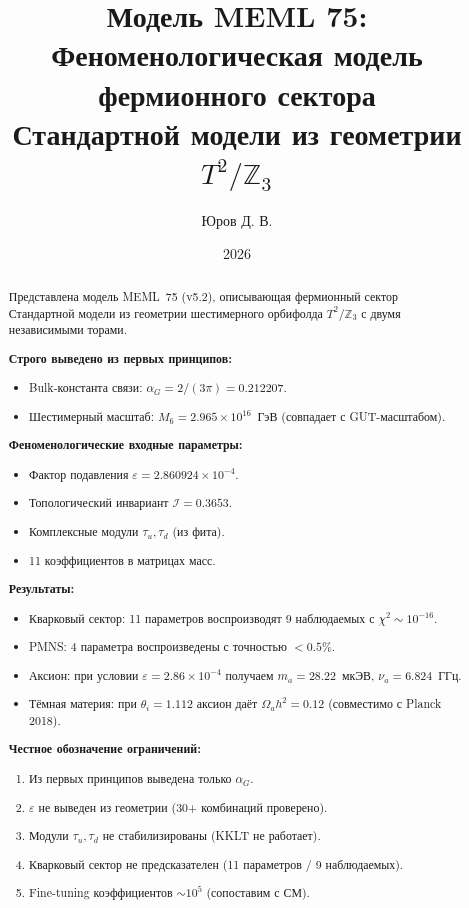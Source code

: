 \documentclass[12pt,a4paper]{article}
\title{%
    \textbf{Модель MEML 75:} \\[0.3cm]
    \large Феноменологическая модель фермионного сектора \\
    Стандартной модели из геометрии $T^2/\mathbb{Z}_3$%
}
\author{Юров Д. В.}
\date{2026}
\numberwithin{equation}{section}
\begin{document}
\maketitle

\begin{abstract}
Представлена модель MEML~75 (v5.2), описывающая фермионный сектор 
Стандартной модели из геометрии шестимерного орбифолда 
$T^2/\mathbb{Z}_3$ с двумя независимыми торами.

\textbf{Строго выведено из первых принципов:}
\begin{itemize}[leftmargin=1.5em,itemsep=0.05em]
\item Bulk-константа связи: $\alpha_G = 2/(3\pi) = 0.212207$.
\item Шестимерный масштаб: $M_6 = 2.965\times 10^{16}$~ГэВ 
(совпадает с GUT-масштабом).
\end{itemize}

\textbf{Феноменологические входные параметры:}
\begin{itemize}[leftmargin=1.5em,itemsep=0.05em]
\item Фактор подавления $\varepsilon = 2.860924\times 10^{-4}$.
\item Топологический инвариант $\mathcal{I} = 0.3653$.
\item Комплексные модули $\tau_u, \tau_d$ (из фита).
\item 11 коэффициентов в матрицах масс.
\end{itemize}

\textbf{Результаты:}
\begin{itemize}[leftmargin=1.5em,itemsep=0.05em]
\item Кварковый сектор: 11 параметров воспроизводят 9 наблюдаемых 
с $\chi^2 \sim 10^{-16}$.
\item PMNS: 4 параметра воспроизведены с точностью $<0.5\%$.
\item Аксион: при условии $\varepsilon = 2.86\times 10^{-4}$ 
получаем $m_a = 28.22$~мкЭВ, $\nu_a = 6.824$~ГГц.
\item Тёмная материя: при $\theta_i = 1.112$ аксион даёт 
$\Omega_a h^2 = 0.12$ (совместимо с Planck 2018).
\end{itemize}

\textbf{Честное обозначение ограничений:}
\begin{enumerate}[leftmargin=1.5em,itemsep=0.05em]
\item Из первых принципов выведена только $\alpha_G$.
\item $\varepsilon$ не выведен из геометрии (30+ комбинаций проверено).
\item Модули $\tau_u, \tau_d$ не стабилизированы (KKLT не работает).
\item Кварковый сектор не предсказателен (11 параметров / 9 наблюдаемых).
\item Fine-tuning коэффициентов $\sim 10^5$ (сопоставим с СМ).
\end{enumerate}
\end{abstract}
\end{document}
